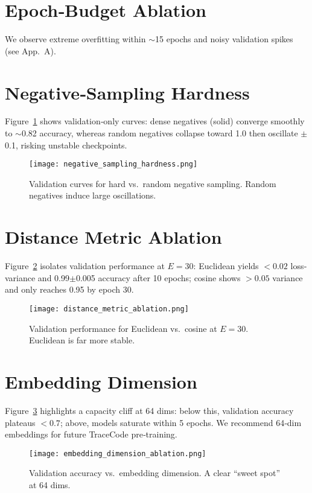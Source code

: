 
\section{Epoch‐Budget Ablation}
We observe extreme overfitting within $\sim$15 epochs and noisy validation spikes (see App.~A).  %

\section{Negative‐Sampling Hardness}
Figure~\ref{fig:neg-sampling} shows validation‐only curves: dense negatives (solid) converge smoothly to $\sim$0.82 accuracy, whereas random negatives collapse toward 1.0 then oscillate $\pm$0.1, risking unstable checkpoints.
\begin{figure}[t]
  \centering
  \texttt{[image: negative\_sampling\_hardness.png]}
  \caption{Validation curves for hard vs.\ random negative sampling. Random negatives induce large oscillations.}
  \label{fig:neg-sampling}
\end{figure}

\section{Distance Metric Ablation}
Figure~\ref{fig:dist-metric} isolates validation performance at $E=30$: Euclidean yields $<0.02$ loss‐variance and 0.99$\pm$0.005 accuracy after 10 epochs; cosine shows $>0.05$ variance and only reaches 0.95 by epoch 30.
\begin{figure}[t]
  \centering
  \texttt{[image: distance\_metric\_ablation.png]}
  \caption{Validation performance for Euclidean vs.\ cosine at $E=30$. Euclidean is far more stable.}
  \label{fig:dist-metric}
\end{figure}

\section{Embedding Dimension}
Figure~\ref{fig:embed-dim} highlights a capacity cliff at 64 dims: below this, validation accuracy plateaus $<0.7$; above, models saturate within 5 epochs. We recommend 64‐dim embeddings for future TraceCode pre‐training.
\begin{figure}[t]
  \centering
  \texttt{[image: embedding\_dimension\_ablation.png]}
  \caption{Validation accuracy vs.\ embedding dimension. A clear “sweet spot” at 64 dims.}
  \label{fig:embed-dim}
\end{figure}

